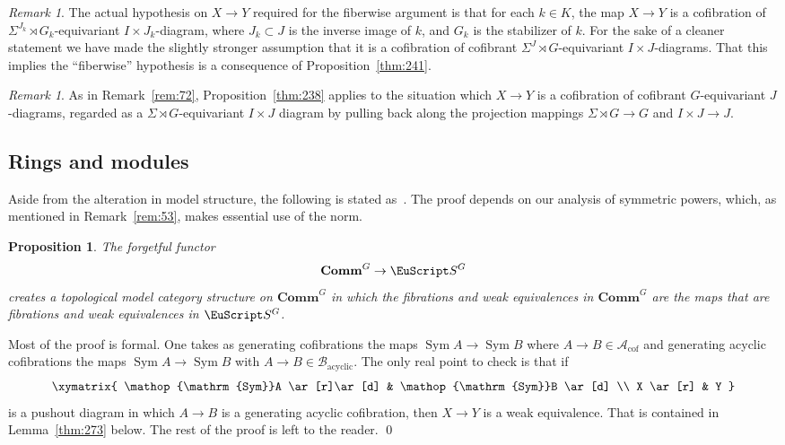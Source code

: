 \documentclass{amsart}
\newtheorem{prop}[equation]{Proposition}
\newtheorem{rem}[equation]{Remark}
\theoremstyle{definition}
\theoremstyle{remark}
\newtheorem{rem}[equation]{Remark}
\newenvironment{pf}{\bigskip{\em Proof:\/}}{\qed\medskip}
\DeclareMathOperator{\sym}{Sym}
\newcommand{\spectra}{\EuScript S}
\newcommand{\einftycat}{\mathbf{Comm}}
\newcommand{\ugeinftycat}[1]{\einftycat^{#1}}
\newcommand{\ugspectra}[1]{\spectra^{#1}}
\newcommand{\gencof}{\mathcal A_{\text{cof}}}
\newcommand{\genacyclic}{\mathcal B_{\text{acyclic}}}
\begin{document}
\begin{rem}
\label{rem:75} The actual hypothesis on $X\to Y$ required for the
fiberwise argument is that for each $k\in K$, the map $X\to Y$ is a
cofibration of $\Sigma^{J_{k}}\rtimes G_{k}$-equivariant $I\times
J_{k}$-diagram, where $J_{k}\subset J$ is the inverse image of $k$,
and $G_{k}$ is the stabilizer of $k$.  For the sake of a cleaner
statement we have made the slightly stronger assumption that it is a
cofibration of cofibrant $\Sigma^{J}\rtimes G$-equivariant $I\times
J$-diagrams.  That this implies the ``fiberwise'' hypothesis is a
consequence of Proposition~\ref{thm:241}.
\end{rem}


\begin{rem}
\label{rem:74} As in Remark~\ref{rem:72}, Proposition~\ref{thm:238}
applies to the situation which $X\to Y$ is a cofibration of cofibrant
$G$-equivariant $J$-diagrams, regarded as a $\Sigma\rtimes
G$-equivariant $I\times J$ diagram by pulling back along the
projection mappings $\Sigma\rtimes G\to G$ and $I\times J\to J$.
\end{rem}


\subsection{Rings and modules}
\label{sec:rings-modules}

Aside from the alteration in model structure, the following is stated
as~\cite[Theorem III.8.1]{MR1922205}.  The proof depends on our
analysis of symmetric powers, which, as mentioned in
Remark~\ref{rem:53}, makes essential use of the norm.

\begin{prop}
\label{thm:114}
The forgetful functor 
\[
\ugeinftycat{G}\to \ugspectra{G}
\]
creates a topological model category structure on $\ugeinftycat{G}$ in
which the fibrations and weak equivalences in $\ugeinftycat{G}$ are the
maps that are fibrations and weak equivalences in $\ugspectra{G}$.
\end{prop}

\begin{pf}
Most of the proof is  formal.   One takes as generating 
cofibrations the maps $\sym A\to\sym B$ where $A\to B\in \gencof$
and generating acyclic cofibrations the maps $\sym A\to \sym B$ with
$A\to B\in \genacyclic$.     The only real point to check is that if
\begin{equation}
\label{eq:178}
\xymatrix{
\sym A  \ar[r]\ar[d]  &  \sym B \ar[d] \\
X  \ar[r]        & Y
}
\end{equation}
is a pushout diagram in which $A\to B$ is a generating acyclic
cofibration, then $X\to Y$ is a weak equivalence.  That is contained
in Lemma~\ref{thm:273} below.  The rest of the proof is left to the
reader.
\end{pf}
\end{document}
